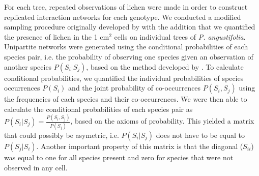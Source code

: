 \documentclass[11pt,twocolumn,twoside,lineno]{pnas-new}
\begin{document}
{For each tree, repeated observations of lichen were made in order to
construct replicated interaction networks for each genotype. We
conducted a modified sampling procedure originally developed by
\citep{Lamit2015a} with the addition that we quantified the presence of
lichen in the 1 cm$^2$ cells on individual trees of
\textit{P. angustifolia}. Unipartite networks were generated using the
conditional probabilities of each species pair, i.e. the probability
of observing one species given an observation of another species
$P(S_i | S_j)$, based on the method developed by
\citep{Araujo2011}. To calculate conditional probabilities, we
quantified the individual probabilities of species occurrences
$P(S_i)$ and the joint probability of co-occurrences $P(S_i,S_j)$
using the frequencies of each species and their co-occurrences. We
were then able to calculate the conditional probabilities of each
species pair as $P(S_i|S_j) = \frac{P(S_i,S_j)}{P(S_j)}$, based on the
axioms of probability. This yielded a matrix that could possibly be
asymetric, i.e. $P(S_i|S_j)$ does not have to be equal to
$P(S_j|S_i)$. Another important property of this matrix is that the
diagonal ($S_{ii}$) was equal to one for all species present and zero
for species that were not observed in any cell.

}
\end{document}
